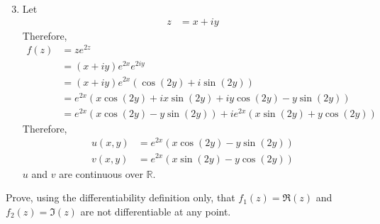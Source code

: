 \documentclass[fleqn, a4paper, 11pt, oneside]{amsart}
\theoremstyle{definition}
\theoremstyle{theorem}
\begin{document}
\begin{solution}
	\begin{enumerate}[label=({\alph*}), leftmargin=*]
		\setcounter{enumi}{2}
		\item
			Let
			\begin{align*}
				z &= x + i y
			\end{align*}
			Therefore,
			\begin{align*}
				f(z) &= z e^{2 z}\\
				&= (x + i y) e^{2 x} e^{2 i y}\\
				&= (x + i y) e^{2 x} \left( \cos(2 y) + i \sin(2 y) \right)\\
				&= e^{2 x} \left( x \cos(2 y) + i x \sin(2 y) + i y \cos(2 y) - y \sin(2 y) \right)\\
				&= e^{2 x} \left( x \cos(2 y) - y \sin(2 y) \right) + i e^{2 x} \left( x \sin(2 y) + y \cos(2 y) \right)
			\end{align*}
			Therefore,
			\begin{align*}
				u(x,y) &= e^{2 x} \left( x \cos(2 y) - y \sin(2 y) \right)\\
				v(x,y) &= e^{2 x} \left( x \sin(2 y) - y \cos(2 y) \right)
			\end{align*}
			$u$ and $v$ are continuous over $\mathbb{R}$.
	\end{enumerate}
\end{solution}

\setcounter{question}{6}
\begin{question}
	Prove, using the differentiability definition only, that $f_1(z) = \Re(z)$ and $f_2(z) =\Im(z)$ are not differentiable at any point.
\end{question}
\end{document}
